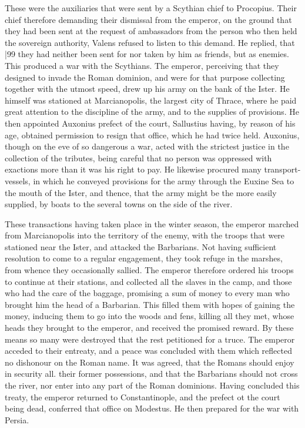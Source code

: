 These were the auxiliaries that were sent by a Scythian chief to Procopius. Their chief therefore demanding their dismissal from the emperor, on the ground that they had been sent at the request of ambassadors from the person who then held the sovereign authority, Valens refused to listen to this demand. He replied, that
|99 they had neither been sent for nor taken by him as friends, but as enemies. This produced a war with the Scythians. The emperor, perceiving that they designed to invade the Roman dominion, and were for that purpose collecting together with the utmost speed, drew up his army on the bank of the Ister. He himself was stationed at Marcianopolis, the largest city of Thrace, where he paid great attention to the discipline of the army, and to the supplies of provisions. He then appointed Auxonius prefect of the court, Sallustius having, by reason of his age, obtained permission to resign that office, which he had twice held. Auxonius, though on the eve of so dangerous a war, acted with the strictest justice in the collection of the tributes, being careful that no person was oppressed with exactions more than it was his right to pay. He likewise procured many transport-vessels, in which he conveyed provisions for the army through the Euxine Sea to the mouth of the Ister, and thence, that the army might be the more easily supplied, by boats to the several towns on the side of the river.

These transactions having taken place in the winter season, the emperor marched from Marcianopolis into the territory of the enemy, with the troops that were stationed near the Ister, and attacked the Barbarians. Not having sufficient resolution to come to a regular engagement, they took refuge in the marshes, from whence they occasionally sallied. The emperor therefore ordered his troops to continue at their stations, and collected all the slaves in the camp, and those who had the care of the baggage, promising a sum of money to every man who brought him the head of a Barbarian. This filled them with hopes of gaining the money, inducing them to go into the woods and fens, killing all they met, whose heads they brought to the emperor, and received the promised reward. By these means so many were destroyed that the rest petitioned for a truce. The emperor acceded to their entreaty, and a peace was concluded with them which reflected no dishonour on the Roman name. It was agreed, that the Romans should enjoy in security all. their former possessions, and that the Barbarians should not cross the river, nor enter into any part of the Roman dominions. Having concluded this treaty, the emperor returned to Constantinople, and the prefect ot the court being dead, conferred that office on Modestus. He then prepared for the war with Persia.

